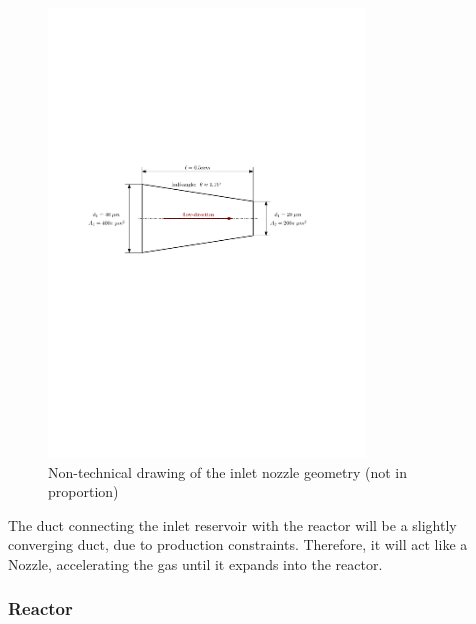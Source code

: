 	\begin{figure}[H]
	    \centering
	    \includegraphics[width=0.75\textwidth]{src/03_analytical-work/fig_inlet-nozzle-geometry.pdf}
	    \caption{Non-technical drawing of the inlet nozzle geometry (not in proportion)}
	    \label{fig:geometry-inlet-nozzle}
	\end{figure}
	The duct connecting the inlet reservoir with the reactor will be a slightly converging duct, due to production constraints.
	Therefore, it will act like a Nozzle, accelerating the gas until it expands into the reactor.
	
\subsubsection*{Reactor}

